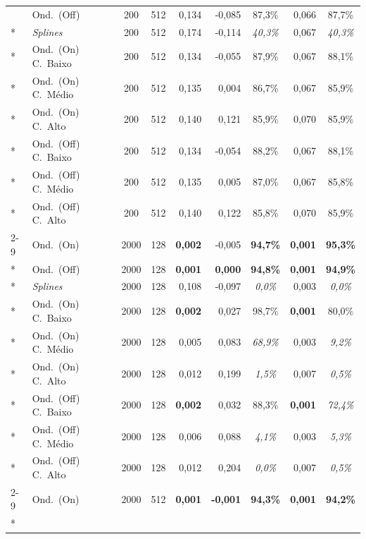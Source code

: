 {\begin{longtable}{@{}llccrrcrc@{}}
   & Ond.\ (Off) & 200 & 512 & 0{,}134 & -0{,}085 & 87{,}3\% & 0{,}066 & 87{,}7\% \\*
   & \emph{Splines} & 200 & 512 & 0{,}174 & -0{,}114 & \textit{40{,3\%}} & 0{,}067 & \textit{40{,3\%}} \\*
   & Ond.\ (On) C.\ Baixo & 200 & 512 & 0{,}134 & -0{,}055 & 87{,}9\% & 0{,}067 & 88{,}1\% \\*
   & Ond.\ (On) C.\ Médio & 200 & 512 & 0{,}135 & 0{,}004 & 86{,}7\% & 0{,}067 & 85{,}9\% \\*
   & Ond.\ (On) C.\ Alto & 200 & 512 & 0{,}140 & 0{,}121 & 85{,}9\% & 0{,}070 & 85{,}9\% \\*
   & Ond.\ (Off) C.\ Baixo & 200 & 512 & 0{,}134 & -0{,}054 & 88{,}2\% & 0{,}067 & 88{,}1\% \\*
   & Ond.\ (Off) C.\ Médio & 200 & 512 & 0{,}135 & 0{,}005 & 87{,}0\% & 0{,}067 & 85{,}8\% \\*
   & Ond.\ (Off) C.\ Alto & 200 & 512 & 0{,}140 & 0{,}122 & 85{,}8\% & 0{,}070 & 85{,}9\% \\
  \cmidrule{2-9}
  \multirow{9}{*}{\rotatebox[origin=c]{90}{Escada}} & Ond.\ (On) & 2000 & 128 & \textbf{0{,002}} & -0{,005} & \textbf{94{,7\%}} & \textbf{0{,001}} & \textbf{95{,3\%}} \\*
   & Ond.\ (Off) & 2000 & 128 & \textbf{0{,001}} & \textbf{0{,000}} & \textbf{94{,8\%}} & \textbf{0{,001}} & \textbf{94{,9\%}} \\*
   & \emph{Splines} & 2000 & 128 & 0{,108} & -0{,}097 & \textit{0{,0\%}} & 0{,}003 & \textit{0{,0\%}} \\*
   & Ond.\ (On) C.\ Baixo & 2000 & 128 & \textbf{0{,002}} & 0{,027} & 98{,7\%} & \textbf{0{,001}} & 80{,0\%} \\*
   & Ond.\ (On) C.\ Médio & 2000 & 128 & 0{,005} & 0{,083} & \textit{68{,9\%}} & 0{,003} & \textit{9{,2\%}} \\*
   & Ond.\ (On) C.\ Alto & 2000 & 128 & 0{,}012 & 0{,}199 & \textit{1{,5\%}} & 0{,007} & \textit{0{,5\%}} \\*
   & Ond.\ (Off) C.\ Baixo & 2000 & 128 & \textbf{0{,002}} & 0{,032} & 88{,3\%} & \textbf{0{,001}} & \textit{72{,4\%}} \\*
   & Ond.\ (Off) C.\ Médio & 2000 & 128 & 0{,006} & 0{,088} & \textit{4{,1\%}} & 0{,003} & \textit{5{,3\%}} \\*
   & Ond.\ (Off) C.\ Alto & 2000 & 128 & 0{,}012 & 0{,}204 & \textit{0{,0\%}} & 0{,007} & \textit{0{,5\%}} \\
  \cmidrule{2-9}
  \multirow{9}{*}{\rotatebox[origin=c]{90}{Escada}} & Ond.\ (On) & 2000 & 512 & \textbf{0{,001}} & \textbf{-0{,001}} & \textbf{94{,3\%}} & \textbf{0{,001}} & \textbf{94{,2\%}} \\*

\end{longtable}}
